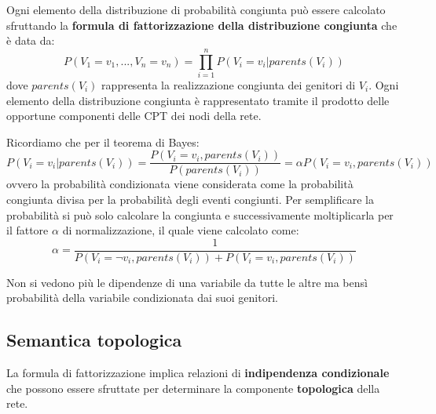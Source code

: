 Ogni elemento della distribuzione di probabilità congiunta può essere calcolato
sfruttando la \textbf{formula di fattorizzazione della distribuzione congiunta}
che è data da:
\begin{equation}
    P(V_1 = v_1,...,V_n = v_n) = \prod_{i=1}^{n} P(V_i=v_i|parents(V_i))
\end{equation}
dove $parents(V_i)$ rappresenta la realizzazione congiunta dei genitori di $V_i$.
Ogni elemento della distribuzione congiunta è rappresentato tramite il prodotto
delle opportune componenti delle CPT dei nodi della rete.
\begin{nota}
    Ricordiamo che per il teorema di Bayes:
    \begin{equation*}
        P(V_i = v_i|parents(V_i)) = \frac{P(V_i = v_i,parents(V_i))}{P(parents(V_i))}
        = \alpha P(V_i = v_i,parents(V_i))
    \end{equation*}
    ovvero la probabilità condizionata viene considerata come la probabilità
    congiunta divisa per la probabilità degli eventi congiunti. Per semplificare
    la probabilità si può solo calcolare la congiunta e successivamente moltiplicarla
    per il fattore $\alpha$ di normalizzazione, il quale viene calcolato come:
    \begin{equation*}
        \alpha = \frac{1}{P(V_i = \lnot v_i, parents(V_i)) + P(V_i = v_i,parents(V_i))}
    \end{equation*}
\end{nota}
\begin{nota}
    Non si vedono più le dipendenze di una variabile da tutte le altre ma bensì
    probabilità della variabile condizionata dai suoi genitori.
\end{nota}
\subsection{Semantica topologica}
La formula di fattorizzazione implica relazioni di \textbf{indipendenza condizionale}
che possono essere sfruttate per determinare la componente \textbf{topologica}
della rete.

